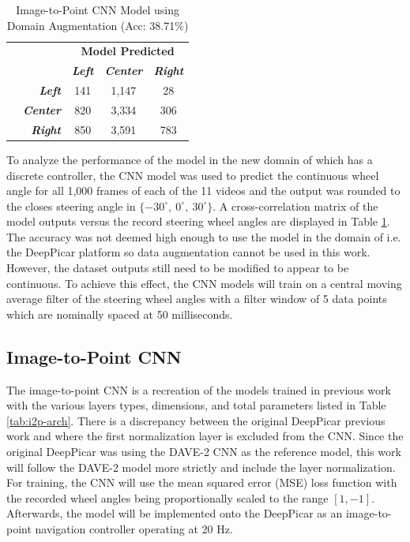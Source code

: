 \documentclass[conference]{IEEEtran}
\begin{document}
\begin{table}[btp]
        \centering
            \caption{Image-to-Point CNN Model using Domain Augmentation (Acc: 38.71\%)}
            \begin{tabular}{|c|r|c|c|c|}
            \multicolumn{2}{c}{} & \multicolumn{3}{c}{\bfseries Model Predicted}\\\cline{3-5}
            \multicolumn{1}{c}{} & & \textbf{\textit{Left}} & \textbf{\textit{Center}} & \textbf{\textit{Right}}\\\hline
             \parbox[t]{2mm}{} & \textbf{\textit{Left}} & 141 & 1,147 & 28 \\
            & \textbf{\textit{Center}} & 820 & 3,334 & 306 \\
            & \textbf{\textit{Right}} & 850 & 3,591 & 783 \\\hline
            \end{tabular}
        \label{tab:i2p-da-acc}
    \end{table}

To analyze the performance of the model in the new domain of \cite{bechtel2018} which has a discrete controller, the CNN model was used to predict the continuous wheel angle for all 1,000 frames of each of the 11 videos and the output was rounded to the closes steering angle in $\lbrace -30^\circ,\ 0^\circ,\ 30^\circ \rbrace$. A cross-correlation matrix of the model outputs versus the record steering wheel angles are displayed in Table \ref{tab:i2p-da-acc}. The accuracy was not deemed high enough to use the model in the domain of \cite{bechtel2018} i.e. the DeepPicar platform so data augmentation cannot be used in this work. However, the \cite{bechtel2018} dataset outputs still need to be  modified to appear to be continuous. To achieve this effect, the CNN models will train on a central moving average filter of the steering wheel angles with a filter window of 5 data points which are nominally spaced at 50 milliseconds.

\subsection{Image-to-Point CNN}

The image-to-point CNN is a recreation of the models trained in previous work \cite{bechtel2018,bojarski2016end} with the various layers types, dimensions, and total parameters listed in Table \ref{tab:i2p-arch}. There is a discrepancy between the original DeepPicar previous work \cite{bechtel2018} and \cite{bojarski2016end} where the first normalization layer is excluded from the CNN. Since the original DeepPicar was using the DAVE-2 CNN as the reference model, this work will follow the DAVE-2 model more strictly and include the layer normalization. For training, the CNN will use the mean squared error (MSE) loss function with the recorded wheel angles being proportionally scaled to the range $[1, -1]$. Afterwards, the model will be implemented onto the DeepPicar as an image-to-point navigation controller operating at 20 Hz.
\end{document}
